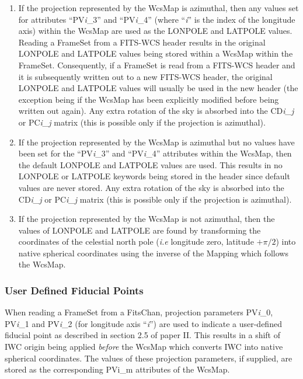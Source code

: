 \documentclass[twoside,11pt]{starlink}
\begin{document}
\begin{enumerate}

\item If the projection represented by the WcsMap is
azimuthal, then any values set for attributes ``PV\emph{i}\_3''
and ``PV\emph{i}\_4'' (where ``\emph{i}'' is the index of the longitude axis)
within the WcsMap are used as the LONPOLE and LATPOLE values. Reading a
FrameSet from a FITS-WCS header
results in the original LONPOLE and LATPOLE values being stored within a
WcsMap within the FrameSet. Consequently, if a FrameSet is read from a
FITS-WCS header and it is subsequently written out to a new FITS-WCS
header, the original LONPOLE and LATPOLE values will usually be used in
the new header (the exception being if the WcsMap has been explicitly
modified before being written out again). Any extra rotation of the sky
is absorbed into the CD\emph{i\_j} or PC\emph{i\_j} matrix (this is
possible only if the projection is azimuthal).

\item If the projection represented by the WcsMap is azimuthal but no
values have been set for the ``PV\emph{i}\_3'' and ``PV\emph{i}\_4''
attributes within the WcsMap, then the default LONPOLE and LATPOLE values
are used. This results in no LONPOLE or LATPOLE keywords being stored in
the header since default values are never stored. Any extra rotation of
the sky is absorbed into the CD\emph{i\_j} or PC\emph{i\_j} matrix (this
is possible only if the projection is azimuthal).

\item If the projection represented by the WcsMap is not azimuthal,
then the values of LONPOLE and LATPOLE are found by transforming the
coordinates of the celestial north pole (\emph{i.e} longitude zero,
latitude $+\pi/2$) into native spherical coordinates using the inverse of
the Mapping which follows the WcsMap.

\end{enumerate}

\subsubsection{User Defined Fiducial Points}
When reading a FrameSet from a FitsChan, projection parameters
PV\emph{i}\_0, PV\emph{i}\_1 and PV\emph{i}\_2 (for longitude axis
``\emph{i}'') are used to indicate a user-defined fiducial point as
described in section 2.5 of paper II. This results in a shift of IWC
origin being applied \emph{before} the WcsMap which converts
IWC into
native spherical coordinates. The values of these projection parameters,
if supplied, are stored as the corresponding PVi\_m attributes
of the WcsMap.
\end{document}

